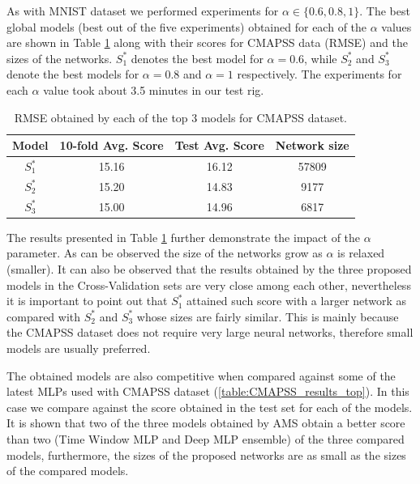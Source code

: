 \documentclass[journal]{IEEEtran}
\begin{document}
As with MNIST dataset we performed experiments for $\alpha \in \{0.6, 0.8, 1\}$. The best global models (best out of the five experiments) obtained for each of the $\alpha$ values are shown in Table \ref{table:avg_rmse_cmapss} along with their scores for CMAPSS data (RMSE) and the sizes of the networks. $S^*_1$ denotes the best model for $\alpha = 0.6$, while $S^*_2$ and $S^*_3$ denote the best models for $\alpha = 0.8$ and $\alpha = 1$ respectively. The experiments for each $\alpha$ value took about 3.5 minutes in our test rig.

\begin{table}[!htb]
\begin{center}
\begin{tabular}{| c | c | c | c |}
\hline
Model & 10-fold Avg. Score & Test Avg. Score & Network size\\
\hline
$S^*_1$ & 15.16 & 16.12 & 57809\\
$S^*_2$ & 15.20 & 14.83 & 9177\\
$S^*_3$ & 15.00 & 14.96 & 6817\\
\hline
\end{tabular}
\end{center}
\caption{RMSE obtained by each of the top 3 models for CMAPSS dataset.}
\label{table:avg_rmse_cmapss}
\end{table}

The results presented in Table \ref{table:avg_rmse_cmapss} further demonstrate the impact of the $\alpha$ parameter. As can be observed the size of the networks grow as $\alpha$ is relaxed (smaller). It can also be observed that the results obtained by the three proposed models in the Cross-Validation sets are very close among each other, nevertheless it is important to point out that $S^*_1$ attained such score with a larger network as compared with $S^*_2$ and $S^*_3$ whose sizes are fairly similar. This is mainly because the CMAPSS dataset does not require very large neural networks, therefore small models are usually preferred. 

The obtained models are also competitive when compared against some of the latest MLPs used with CMAPSS dataset (\ref{table:CMAPSS_results_top}). In this case we compare against the score obtained in the test set for each of the models. It is shown that two of the three models obtained by AMS obtain a better score than two (Time Window MLP and Deep MLP ensemble) of the three compared models, furthermore, the sizes of the proposed networks are as small as the sizes of the compared models. 
\end{document}
